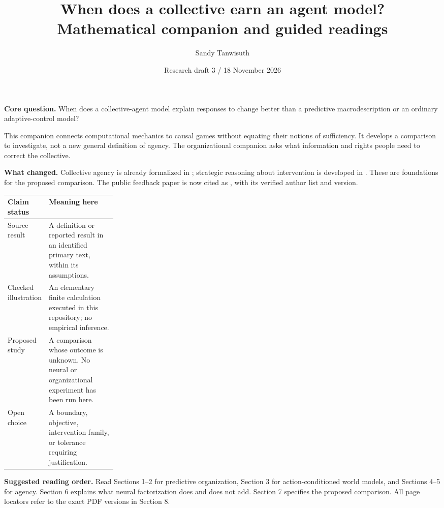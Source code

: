 \documentclass[11pt,letterpaper]{article}
\title{When does a collective earn an agent model?\\\large Mathematical companion and guided readings}
\author{Sandy Tanwisuth}
\date{Research draft 3 / 18 November 2026}
\begin{document}
\maketitle
\textbf{Core question.} When does a collective-agent model explain responses to change better than a predictive macrodescription or an ordinary adaptive-control model?

This companion connects computational mechanics to causal games without equating their notions of sufficiency. It develops a comparison to investigate, not a new general definition of agency. The organizational companion asks what information and rights people need to correct the collective.

\textbf{What changed.} Collective agency is already formalized in \citet{jorgensen2026collective}; strategic reasoning about intervention is developed in \citet{hammond2023games}. These are foundations for the proposed comparison. The public feedback paper is now cited as \citet{ehrlich2026feedback}, with its verified author list and version.

\begin{tabularx}{\linewidth}{L{0.25\linewidth}Y}\toprule
Claim status & Meaning here \\\midrule
Source result & A definition or reported result in an identified primary text, within its assumptions. \\
Checked illustration & An elementary finite calculation executed in this repository; no empirical inference. \\
Proposed study & A comparison whose outcome is unknown. No neural or organizational experiment has been run here. \\
Open choice & A boundary, objective, intervention family, or tolerance requiring justification. \\\bottomrule
\end{tabularx}

\textbf{Suggested reading order.} Read Sections 1--2 for predictive organization, Section 3 for action-conditioned world models, and Sections 4--5 for agency. Section 6 explains what neural factorization does and does not add. Section 7 specifies the proposed comparison. All page locators refer to the exact PDF versions in Section 8.
\end{document}
